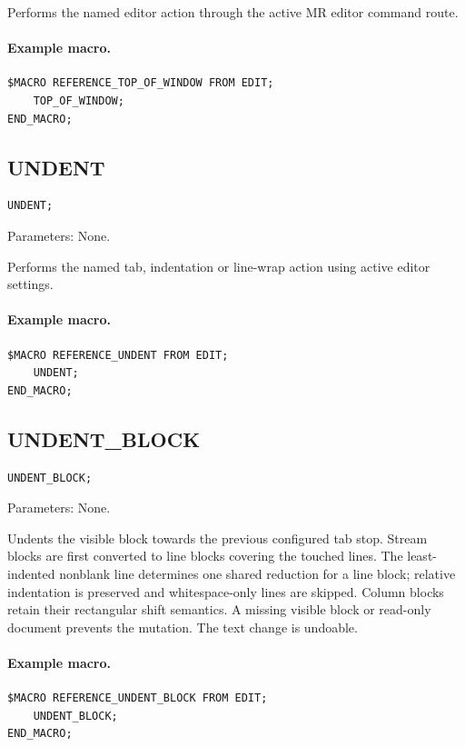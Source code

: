 \documentclass[a4paper,10pt,twoside,openany]{book}
\newenvironment{mrmacextension}{\begin{changebar}}{\end{changebar}}
\begin{document}
Performs the named editor action through the active MR editor command route.

\paragraph{Example macro.}
\begin{verbatim}
$MACRO REFERENCE_TOP_OF_WINDOW FROM EDIT;
    TOP_OF_WINDOW;
END_MACRO;
\end{verbatim}

\label{prim:procedure-undent}
\subsection*{UNDENT}
\begin{verbatim}
UNDENT;
\end{verbatim}
Parameters: None.

Performs the named tab, indentation or line-wrap action using active editor settings.

\paragraph{Example macro.}
\begin{verbatim}
$MACRO REFERENCE_UNDENT FROM EDIT;
    UNDENT;
END_MACRO;
\end{verbatim}

\begin{mrmacextension}
\label{prim:procedure-undent-block}
\subsection*{UNDENT\_BLOCK}
\begin{verbatim}
UNDENT_BLOCK;
\end{verbatim}
Parameters: None.

Undents the visible block towards the previous configured tab stop. Stream
blocks are first converted to line blocks covering the touched lines. The
least-indented nonblank line determines one shared reduction for a line block;
relative indentation is preserved and whitespace-only lines are skipped.
Column blocks retain their rectangular shift semantics. A missing visible
block or read-only document prevents the mutation. The text change is
undoable.

\paragraph{Example macro.}
\begin{verbatim}
$MACRO REFERENCE_UNDENT_BLOCK FROM EDIT;
    UNDENT_BLOCK;
END_MACRO;
\end{verbatim}
\end{mrmacextension}
\end{document}
